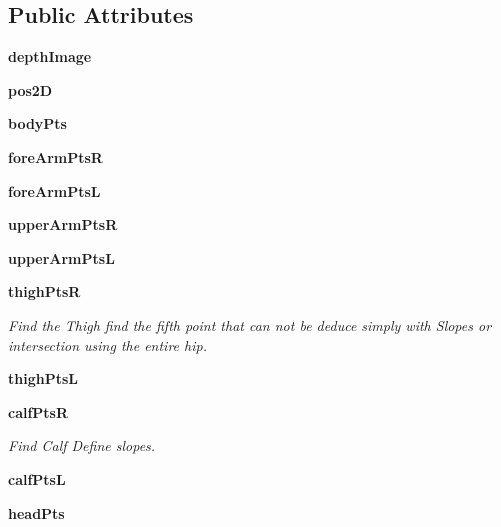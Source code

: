 \subsection*{Public Attributes}
\begin{DoxyCompactItemize}
\item 
\mbox{\label{classsegmentation_1_1_segmentation_a36ea52b517559b5691e5bc72588b2701}} 
{\bfseries depth\+Image}
\item 
\mbox{\label{classsegmentation_1_1_segmentation_a354e16a494df339af336594c1e1844f0}} 
{\bfseries pos2D}
\item 
\mbox{\label{classsegmentation_1_1_segmentation_aacd82fcfebb0f0cd30f9e45c96f6394b}} 
{\bfseries body\+Pts}
\item 
\mbox{\label{classsegmentation_1_1_segmentation_a7302304f2b0c3d89af45c50aa33a828c}} 
{\bfseries fore\+Arm\+PtsR}
\item 
\mbox{\label{classsegmentation_1_1_segmentation_ad1a1f1e70672d02fff598618e147d0c8}} 
{\bfseries fore\+Arm\+PtsL}
\item 
\mbox{\label{classsegmentation_1_1_segmentation_af82bbe5af405d55ecf4b95f9bf13f395}} 
{\bfseries upper\+Arm\+PtsR}
\item 
\mbox{\label{classsegmentation_1_1_segmentation_acd5f5a3d2af4b3132a8c47a4f74464d7}} 
{\bfseries upper\+Arm\+PtsL}
\item 
\mbox{\label{classsegmentation_1_1_segmentation_ab687d252753954c9d8a532e5b098e637}} 
\textbf{ thigh\+PtsR}
\begin{DoxyCompactList}\small\item\em Find the Thigh find the fifth point that can not be deduce simply with Slopes or intersection using the entire hip. \end{DoxyCompactList}\item 
\mbox{\label{classsegmentation_1_1_segmentation_a32dde4e5585db094b44c3ab757f3ab9e}} 
{\bfseries thigh\+PtsL}
\item 
\mbox{\label{classsegmentation_1_1_segmentation_aa926f14b37ee6275803ad15bbf417310}} 
\textbf{ calf\+PtsR}
\begin{DoxyCompactList}\small\item\em Find Calf Define slopes. \end{DoxyCompactList}\item 
\mbox{\label{classsegmentation_1_1_segmentation_a31e43c1089bb4017d23601a86c13fba7}} 
{\bfseries calf\+PtsL}
\item 
\mbox{\label{classsegmentation_1_1_segmentation_a560a42d6f83dfe01e32efb93fff9eecf}} 
{\bfseries head\+Pts}
\end{DoxyCompactItemize}


